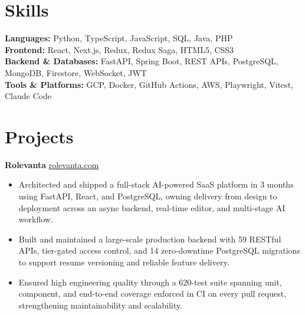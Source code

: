 \documentclass[11pt]{article}       %
\begin{document}
\vspace{-10.5pt}

\section*{Skills}
\textbf{Languages:} Python, TypeScript, JavaScript, SQL, Java, PHP \\
\textbf{Frontend:} React, Next.js, Redux, Redux Saga, HTML5, CSS3 \\
\textbf{Backend \& Databases:} FastAPI, Spring Boot, REST APIs, PostgreSQL, MongoDB, Firestore, WebSocket, JWT \\
\textbf{Tools \& Platforms:} GCP, Docker, GitHub Actions, AWS, Playwright, Vitest, Claude Code
\vspace{-5pt}






\section*{Projects}
\textbf{Rolevanta} \hfill \href{https://rolevanta.com}{rolevanta.com} \\
\vspace{-9pt}
\begin{itemize}
  \item Architected and shipped a full-stack AI-powered SaaS platform in 3 months using FastAPI, React, and PostgreSQL, owning delivery from design to deployment across an async backend, real-time editor, and multi-stage AI workflow.
  \item Built and maintained a large-scale production backend with 59 RESTful APIs, tier-gated access control, and 14 zero-downtime PostgreSQL migrations to support resume versioning and reliable feature delivery.
  \item Ensured high engineering quality through a 620-test suite spanning unit, component, and end-to-end coverage enforced in CI on every pull request, strengthening maintainability and scalability.
\end{itemize}
\end{document}
